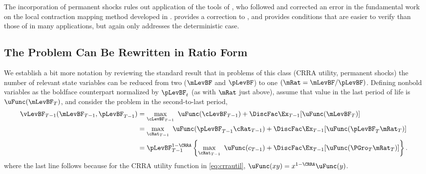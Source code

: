 \documentclass[./BufferStockTheory.tex]{subfiles}
\begin{document}
The incorporation of permanent shocks rules out application of the tools of \cite{mnUnique}, who followed and corrected an error in the fundamental work on the local contraction mapping method developed in \cite{rrExistence}.  \cite{mvExistence} provides a correction to \cite{rrExistence}, and provides conditions that are easier to verify than those of \cite{rrExistence} in many applications, but again only addresses the deterministic case.  

\hypertarget{The-Problem-Can-Be-Rewritten-in-Ratio-Form}{}
\subsection{The Problem Can Be Rewritten in Ratio Form}

\label{subsec:ratio}

We establish a bit more notation by reviewing the standard result that in problems of this class (CRRA utility, permanent shocks) the number of relevant state variables can be reduced from two ($\mLevBF$ and $\pLevBF$) to one $(\mRat = \mLevBF/\pLevBF)$.  Defining nonbold variables as the boldface counterpart normalized by $\pLevBF_{t}$ (as with $\mRat$ just above), assume that value in the last period of life is $\uFunc(\mLevBF_{T})$, and consider the problem in the second-to-last period,
\begin{equation}\begin{gathered}\begin{aligned}
\vLevBF_{T-1}(\mLevBF_{T-1},\pLevBF_{T-1})  & = 
\max_{\cLevBF_{T-1}}~ \uFunc(\cLevBF_{T-1}) +\DiscFac \Ex_{T-1} [ \uFunc(\mLevBF_{T})]
\notag \\
 & =  \max_{\cRat_{T-1}}~
\uFunc(\pLevBF_{T-1}\cRat_{T-1}) + \DiscFac  \Ex_{T-1} [\uFunc(\pLevBF_{T}{\mRat}
_{T})]  \notag \\
 & = \pLevBF_{T-1}^{1-\CRRA}
\left\{\max_{\cRat_{T-1}}~ \uFunc(c_{T-1}) + \DiscFac \Ex_{T-1} [ \uFunc( {\PGro}_{T}
{\mRat}_{T}) ] \right\}  . \label{eq:vBold}
\end{aligned}\end{gathered}\end{equation}
where the last line follows because for the CRRA utility function in \eqref{eq:crrautil}, $\uFunc(xy) =
x^{1-\CRRA}\uFunc(y)$.
\end{document}
